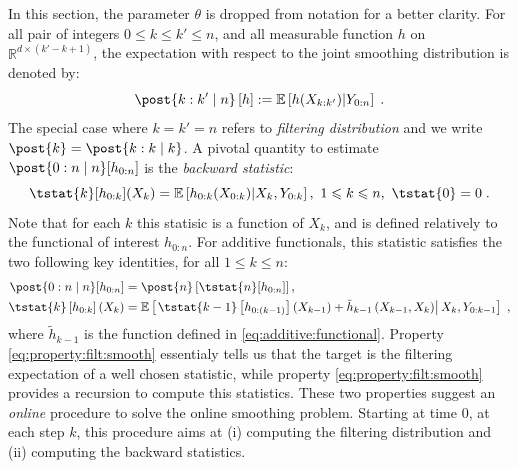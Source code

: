 \documentclass{article}
\newcommand{\parvec}{\theta}
\newcommand{\af}[1]{h_{#1}}
\newcommand{\addf}[1]{\termletter_{#1}}
\newcommand{\termletter}{\tilde{h}}
\def\pE{\mathbb{E}}
\newcommand{\rset}{\ensuremath{\mathbb{R}}}
\newcommand{\eqsp}{\;}
\begin{document}
In this section, the parameter $\parvec$ is dropped from notation for a better clarity. For all pair of integers $0\leq k \leq k' \leq n$, and all measurable function $h$ on $\rset^{d \times (k' - k + 1)}$, the expectation with respect to the joint smoothing distribution is denoted by:
$$
\post{k:k' \mid n} \left[ h \right] := \pE\left[ h(X_{k:k'}) \middle | Y_{0:n} \right]\eqsp .
$$
The special case where $k = k' = n$ refers to \textit{filtering distribution} and we write $\post{k} = \post{k:k \mid k}$.
A pivotal quantity to estimate $\post{0:n \mid n}[\af{0:n}]$ is the \textit{backward statistic}:
\begin{equation}
\label{eq:T:stat}
\tstat{k}[\af{0:k}](X_k) = \pE \left[\af{0:k}(X_{0:k        }) \middle | X_k, Y_{0:k}\right],~1\leqslant k \leqslant n,~\tstat{0} = 0\eqsp.
\end{equation}
Note that for each $k$ this statisic is a function of $X_k$, and is defined relatively to the functional of interest $\af{0:n}$.
For additive functionals, this statistic satisfies the two following key identities, for all $1\leqslant k \leqslant n$:
\begin{align}
\post{0:n \mid n}[\af{0:n}] &= \post{n}\left[\tstat{n}[\af{0:n}] \right], \label{eq:property:filt:smooth}\\
\tstat{k}\left[\af{0:k}\right](X_{k}) &= \pE\left[\left.\tstat{k-1}\left[\af{0:(k-1)}\right]\left(X_{k-1}\right) + \addf{k-1}\left(X_{k-1},X_{k}\right)\right|X_{k},Y_{0:k-1} \right]\eqsp, \label{eq:property:backward}
\end{align} 
where $\addf{k-1}$ is the function defined in \eqref{eq:additive:functional}.
Property \eqref{eq:property:filt:smooth} essentialy tells us that the target is the filtering expectation of a well chosen statistic, while property \eqref{eq:property:filt:smooth} provides  a recursion to compute this statistics. 
These two properties suggest an \textit{online} procedure to solve the online smoothing problem. Starting at time 0, at each step $k$, this procedure aims at (i) computing the filtering distribution and (ii) computing the backward statistics. %
\end{document}
